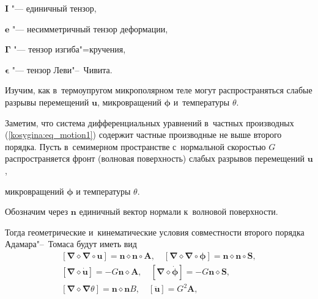 $ {\mathbf{{I}}}$ "--- единичный тензор, 

$ {\mathbf{{e}}}$ "--- несимметричный тензор деформации, 

$ {\mathbf{{\Gamma}}}$ "--- тензор изгиба"=кручения, 

${\boldsymbol{{\epsilon}}}$ "--- тензор Леви"--~Чивита.



\smallskip




Изучим, как в~термоупругом микрополярном теле могут распространяться слабые разрывы перемещений $\mathbf{ u}$, микровращений $\boldsymbol\phi$ и~температуры $\theta$. 

Заметим, что система дифференциальных уравнений в~частных производных (\ref{kosygina:eq_motion1}) содержит частные производные не выше второго порядка. Пусть в~семимерном пространстве с~нормальной скоростью $G$ распространяется фронт (волновая поверхность) слабых разрывов перемещений $\mathbf{ u}$,

микровращений $\boldsymbol{\phi}$ и температуры $\theta$. 

Обозначим через $\mathbf{ n}$ единичный вектор нормали к~волновой поверхности.

Тогда геометрические и~кинематические условия совместности второго порядка Адамара"--~Томаса будут иметь вид \begin{equation}\label{kosygina:usloviya_sovmest_adamara}

\begin{array}{c}

\left[ \boldsymbol \nabla\diamond\boldsymbol \nabla\circ\mathbf{

u}\right]=\mathbf{ n}\diamond\mathbf{ n}\circ\mathbf{ A},\quad

\left[ \boldsymbol \nabla\diamond\boldsymbol \nabla\circ\boldsymbol\phi\right]=\mathbf{ n}\diamond\mathbf{ n}\circ\mathbf{ S},\\

\left[ \boldsymbol \nabla\diamond\dot {\mathbf{ u}}\right]=-G

\mathbf{  n}\diamond\mathbf{ A},\quad [ \boldsymbol

\nabla\diamond\dot{\boldsymbol\phi}]=-G \mathbf{

n}\diamond\mathbf{ S},\\

\left[ \boldsymbol \nabla\diamond\boldsymbol

\nabla\theta\right]=\mathbf{ n}\diamond\mathbf{ n} B,\quad \left[

\ddot{\mathbf{ u}}\right]=G^{2}\mathbf{ A},

\end{array}\end{equation}

